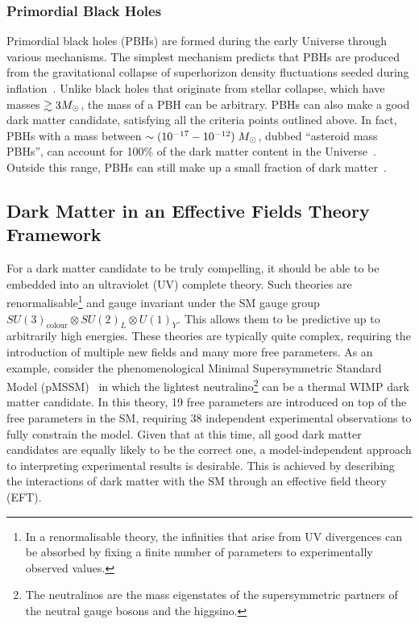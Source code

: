 \subsubsection*{Primordial Black Holes}

Primordial black holes (PBHs) are formed during the early Universe through various mechanisms. The simplest mechanism predicts that PBHs are produced from the gravitational collapse of superhorizon density fluctuations seeded during inflation~\cite{Hawking:1971ei_apr_Gravitationallycollapsedobjects, Carr:1974nx_Blackholesearly,Carr:1975qj_Primordialblackhole}. 
Unlike black holes that originate from stellar collapse, which have masses $\gtrsim 3M_\odot$, the mass of a PBH can be arbitrary.  PBHs can also make a good dark matter candidate, satisfying all the criteria points outlined above. In fact, PBHs with a mass between $\sim (10^{-17} - 10^{-12})\;M_\odot$, dubbed ``asteroid mass PBHs'', can account for 100\% of the dark matter content in the Universe~\cite{Montero-Camacho:2019jte_aug_Revisitingconstraintsasteroidmass}. Outside this range, PBHs can still make up a small fraction of dark matter~\cite{Villanueva-Domingo:2021spv_may_Briefreviewprimordial}. 

\subsection{Dark Matter in an Effective Fields Theory Framework}
\label{subsec:DM_EFTs}

For a dark matter candidate to be truly compelling, it should be able to be embedded into an ultraviolet (UV) complete theory. Such theories are renormalisable\footnote{In a renormalisable theory, the infinities that arise from UV divergences can be absorbed by fixing a finite number of parameters to experimentally observed values.} and gauge invariant under the SM gauge group $SU(3)_\mathrm{colour}\otimes SU(2)_L\otimes U(1)_Y$. This allows them to be predictive up to arbitrarily high energies. These theories are typically quite complex, requiring the introduction of multiple new fields and many more free parameters. As an example, consider the phenomenological Minimal Supersymmetric Standard Model (pMSSM)~\cite{Villanueva-Domingo:2021spv_may_Briefreviewprimordial} in which the lightest neutralino\footnote{The neutralinos are the mass eigenstates of the supersymmetric partners of the neutral gauge bosons and the higgsino.} can be a thermal WIMP dark matter candidate. In this theory, 19 free parameters are introduced on top of the free parameters in the SM, requiring 38 independent experimental observations to fully constrain the model. Given that at this time, all good dark matter candidates are equally likely to be the correct one, a model-independent approach to interpreting experimental results is desirable. This is achieved by describing the interactions of dark matter with the SM through an effective field theory (EFT).

